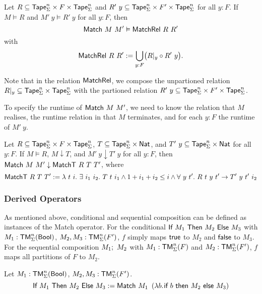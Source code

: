 \begin{lemma}
  \label{lem:Match_Realise}
  Let $R \subseteq \textsf{Tape}_\Sigma^n \times F \times \textsf{Tape}_\Sigma^n$ and $R'~y \subseteq \textsf{Tape}_\Sigma^n \times F' \times \textsf{Tape}_\Sigma^n$ for all $y:F$.
  If $M \vDash R$ and $M'~y \vDash R'~y$ for all $y:F$, then
  \[
    \textsf{Match}~M~M' \vDash \textsf{MatchRel}~R~R'
  \]
  with
  \[
    \textsf{MatchRel}~R~R' := \bigcup_{y:F} \bigl( R{|}_{y} \circ R'~y \bigr).
  \]
\end{lemma}

Note that in the relation $\textsf{MatchRel}$, we compose the unpartioned relation $R {|}_{y} \subseteq \textsf{Tape}_\Sigma^n \times \textsf{Tape}_\Sigma^n$ with the partioned
relation $R'~y \subseteq \textsf{Tape}_\Sigma^n \times F' \times \textsf{Tape}_\Sigma^n$.

To specify the runtime of $\textsf{Match}~M~M'$, we need to know the relation that $M$ realises, the runtime relation in that $M$ terminates, and for each
$y:F$ the runtime of $M'~y$.

\begin{lemma}
  \label{lem:Match_Terminates}
  Let $R \subseteq \textsf{Tape}_\Sigma^n \times F \times \textsf{Tape}_\Sigma^n$, $T \subseteq \textsf{Tape}_\Sigma^n \times \textsf{Nat}$, and
  $T'~y \subseteq \textsf{Tape}_\Sigma^n \times \textsf{Nat}$ for all $y:F$.  If $M \vDash R$, $M \downarrow T$, and $M'~y \downarrow T'~y$ for all $y:F$, then
  $\textsf{Match}~M~M' \downarrow \textsf{MatchT}~R~T~T'$, where
  \[
    \textsf{MatchT}~R~T~T' :=
    \lambda~t~i.~ \exists~i_1~i_2.~T~t~i_1 \land 1+i_1+i_2 \le i \land
      \forall~y~t'.~ R~t~y~t' \rightarrow T'~y~t'~i_2
  \]
\end{lemma}


\subsubsection{Derived Operators}
\label{sec:match-derived-operators}

As mentioned above, conditional and sequential composition can be defined as instances of the Match operator.  For the conditional
$\textsf{If}~M_1~\textsf{Then}~M_2~\textsf{Else}~M_3$ with $M_1 : \textsf{TM}_\Sigma^n(\textsf{Bool})$, $M_2, M_3 : \textsf{TM}_\Sigma^n(F')$, $f$ simply maps $\textsf{true}$ to $M_2$ and $\textsf{false}$ to $M_3$.  For the
sequential composition $M_1 ;~ M_2$ with $M_1 : \textsf{TM}_\Sigma^n(F)$ and $M_2 : \textsf{TM}_\Sigma^n(F')$, $f$ maps all partitions of $F$ to $M_2$.

\begin{definition}[Conditional]
  \label{def:If}
  Let $M_1 : \textsf{TM}_\Sigma^n(\textsf{Bool})$, $M_2, M_3 : \textsf{TM}_\Sigma^n(F')$.
  \[
    \textsf{If}~M_1~\textsf{Then}~M_2~\textsf{Else}~M_3 := \textsf{Match}~M_1~
    \left(\lambda b{.}\hskip.7pt\textsf{if}~b~\textsf{then}~M_2~\textsf{else}~M_3 \right)
  \]
\end{definition}

